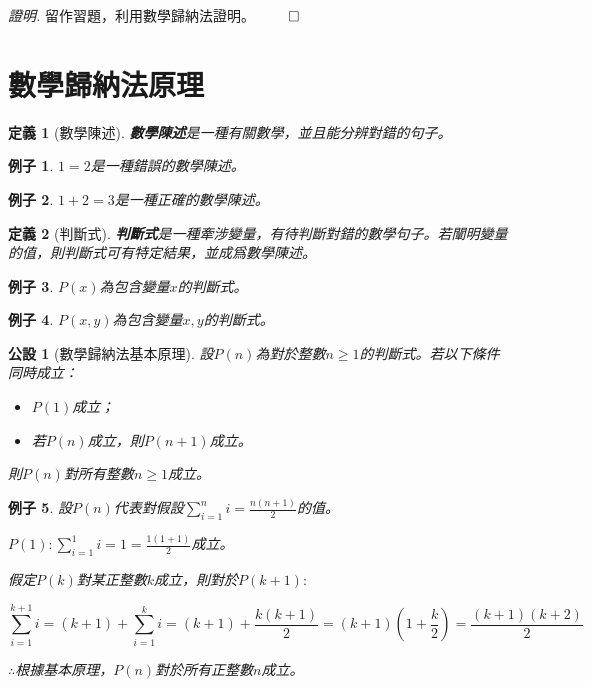 \documentclass[12pt]{article}
\newtheorem{definition}{定義}
\newtheorem*{example}{例子}
\newtheorem*{axiom}{公設}
\renewenvironment*{proof}{\textit{證明.}}{\hfill$\qed$}
\begin{document}
    \begin{proof}
        留作習題，利用數學歸納法證明。
    \end{proof}

    \section*{數學歸納法原理}

    \begin{definition}[數學陳述]
        \textbf{數學陳述}是一種有關數學，並且能分辨對錯的句子。
    \end{definition}

    \begin{example}
        $1=2$是一種錯誤的數學陳述。
    \end{example}

    \begin{example}
        $1+2=3$是一種正確的數學陳述。
    \end{example}

    \begin{definition}[判斷式]
        \textbf{判斷式}是一種牽涉變量，有待判斷對錯的數學句子。若闡明變量的值，則判斷式可有特定結果，並成爲數學陳述。
    \end{definition}

    \begin{example}
        $P(x)$為包含變量$x$的判斷式。
    \end{example}
    
    \begin{example}
        $P(x,y)$為包含變量$x,y$的判斷式。
    \end{example}

    \begin{axiom}[數學歸納法基本原理]
        設$P(n)$為對於整數$n\geq 1$的判斷式。若以下條件同時成立：\begin{itemize}
            \item $P(1)$成立；
            \item 若$P(n)$成立，則$P(n+1)$成立。
        \end{itemize}
        則$P(n)$對所有整數$n\geq 1$成立。
    \end{axiom}

    \begin{example}
        設$P(n)$代表對假設$\displaystyle\sum_{i=1}^{n}i=\frac{n(n+1)}{2}$的值。

        $P(1):\sum_{i=1}^{1}i=1=\frac{1(1+1)}{2}$成立。

        假定$P(k)$對某正整數$k$成立，則對於$P(k+1):$

        $$\sum_{i=1}^{k+1}i=(k+1)+\sum_{i=1}^{k}i=(k+1)+\frac{k(k+1)}{2}=(k+1)(1+\frac{k}{2})=\frac{(k+1)(k+2)}{2}$$

        $\therefore$根據基本原理，$P(n)$對於所有正整數$n$成立。
    \end{example}
\end{document}
